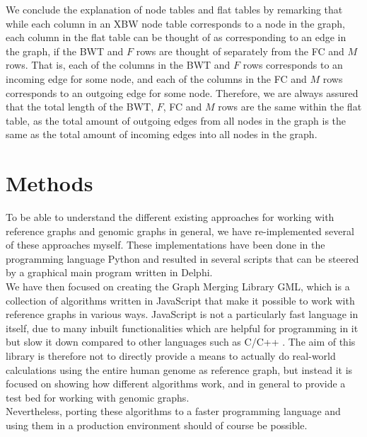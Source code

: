 \documentclass[a4paper,12pt,twoside,BCOR=10mm]{scrbook}
\begin{document}
We conclude the explanation of node tables and flat tables by remarking that while each column
in an XBW node table corresponds to a node in the graph,
each column in the flat table can be thought of as corresponding to an edge in the graph,
if the BWT and $ F $ rows are thought of separately from the FC and $ M $ rows.
That is, each of the columns in the BWT and $ F $ rows corresponds to an incoming edge for some node,
and each of the columns in the FC and $ M $ rows corresponds to an outgoing edge for some node.
Therefore, we are always assured that the total length of the BWT, $ F $, FC and $ M $ rows are the same
within the flat table, as the total amount of outgoing edges from all nodes in the graph is
the same as the total amount of incoming edges into all nodes in the graph.

\chapter{Methods}
%

To be able to understand the different existing approaches for working with
reference graphs and genomic graphs in general, we have re-implemented several
of these approaches myself. These implementations have been done in the programming
language Python and resulted in several scripts that can be steered
by a graphical main program written in Delphi. \\
We have then focused on creating the Graph Merging Library GML, which is a
collection of algorithms written in JavaScript that make it possible to
work with reference graphs in various ways. JavaScript is not a particularly fast
language in itself, due to many inbuilt functionalities which are helpful for programming
in it but slow it down compared to other languages such as C/C++ \citep{Taivalsaari2008}.
The aim of this library is therefore not to directly provide a means to actually do
real-world calculations using the entire human genome as reference graph,
but instead it is focused on showing how different algorithms work,
and in general to provide a test bed for working with genomic graphs. \\
Nevertheless, porting these algorithms to a faster programming language
and using them in a production environment should of course be possible.
\end{document}
